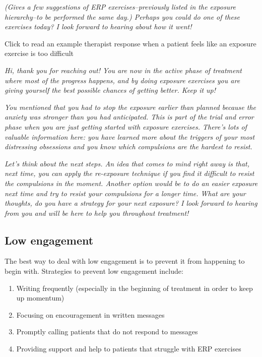 \documentclass[]{book}
\providecommand{\tightlist}{%
  \setlength{\itemsep}{0pt}\setlength{\parskip}{0pt}}
\theoremstyle{definition}
\theoremstyle{definition}
\theoremstyle{definition}
\theoremstyle{remark}
\begin{document}
\emph{(Gives a few suggestions of ERP exercises--previously listed in
the exposure hierarchy--to be performed the same day.) Perhaps you could
do one of these exercises today? I look forward to hearing about how it
went!}

 Click to read an example therapist response when a patient feels like
an exposure exercise is too difficult

\emph{Hi, thank you for reaching out! You are now in the active phase of
treatment where most of the progress happens, and by doing exposure
exercises you are giving yourself the best possible chances of getting
better. Keep it up!}

\emph{You mentioned that you had to stop the exposure earlier than
planned because the anxiety was stronger than you had anticipated. This
is part of the trial and error phase when you are just getting started
with exposure exercises. There's lots of valuable information here: you
have learned more about the triggers of your most distressing obsessions
and you know which compulsions are the hardest to resist.}

\emph{Let's think about the next steps. An idea that comes to mind right
away is that, next time, you can apply the re-exposure technique if you
find it difficult to resist the compulsions in the moment. Another
option would be to do an easier exposure next time and try to resist
your compulsions for a longer time. What are your thoughts, do you have
a strategy for your next exposure? I look forward to hearing from you
and will be here to help you throughout treatment!}

\hypertarget{low-engagement}{%
\subsection{Low engagement}\label{low-engagement}}

The best way to deal with low engagement is to prevent it from happening
to begin with. Strategies to prevent low engagement include:

\begin{enumerate}
\def\labelenumi{\arabic{enumi}.}
\tightlist
\item
  Writing frequently (especially in the beginning of treatment in order
  to keep up momentum)
\item
  Focusing on encouragement in written messages
\item
  Promptly calling patients that do not respond to messages
\item
  Providing support and help to patients that struggle with ERP
  exercises
\end{enumerate}
\end{document}
